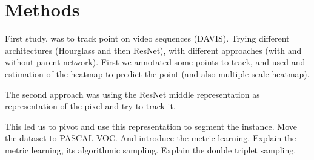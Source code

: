 
%
\chapter{Methods}
\label{cha:methods}


First study, was to track point on video sequences (DAVIS). Trying different architectures (Hourglass and then ResNet), with different approaches (with and without parent network). First we annotated some points to track, and used and estimation of the heatmap to predict the point (and also multiple scale heatmap).

The second approach was using the ResNet middle representation as representation of the pixel and try to track it.

This led us to pivot and use this representation to segment the instance.
Move the dataset to PASCAL VOC. And introduce the metric learning. Explain the metric learning, its algorithmic sampling. Explain the double triplet sampling.
